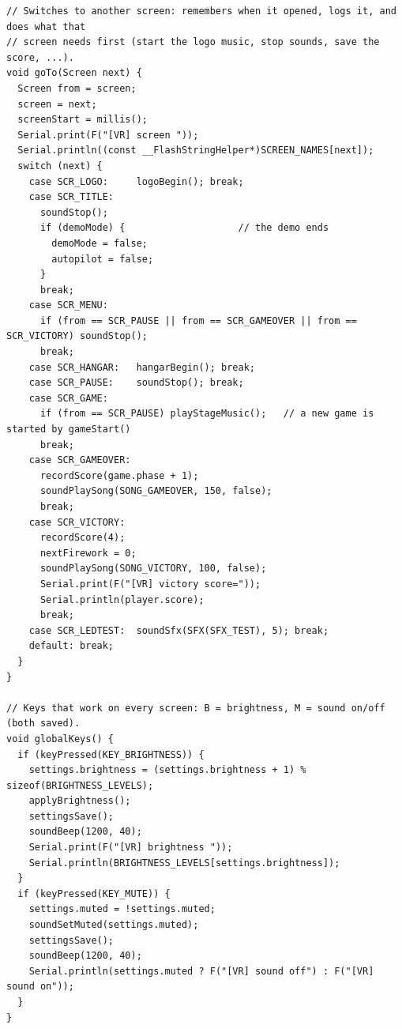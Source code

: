 \documentclass[11pt,a4paper]{article}
\begin{document}
\begin{lstlisting}[language=Arduino]
// Switches to another screen: remembers when it opened, logs it, and does what that
// screen needs first (start the logo music, stop sounds, save the score, ...).
void goTo(Screen next) {
  Screen from = screen;
  screen = next;
  screenStart = millis();
  Serial.print(F("[VR] screen "));
  Serial.println((const __FlashStringHelper*)SCREEN_NAMES[next]);
  switch (next) {
    case SCR_LOGO:     logoBegin(); break;
    case SCR_TITLE:
      soundStop();
      if (demoMode) {                    // the demo ends
        demoMode = false;
        autopilot = false;
      }
      break;
    case SCR_MENU:
      if (from == SCR_PAUSE || from == SCR_GAMEOVER || from == SCR_VICTORY) soundStop();
      break;
    case SCR_HANGAR:   hangarBegin(); break;
    case SCR_PAUSE:    soundStop(); break;
    case SCR_GAME:
      if (from == SCR_PAUSE) playStageMusic();   // a new game is started by gameStart()
      break;
    case SCR_GAMEOVER:
      recordScore(game.phase + 1);
      soundPlaySong(SONG_GAMEOVER, 150, false);
      break;
    case SCR_VICTORY:
      recordScore(4);
      nextFirework = 0;
      soundPlaySong(SONG_VICTORY, 100, false);
      Serial.print(F("[VR] victory score="));
      Serial.println(player.score);
      break;
    case SCR_LEDTEST:  soundSfx(SFX(SFX_TEST), 5); break;
    default: break;
  }
}

// Keys that work on every screen: B = brightness, M = sound on/off (both saved).
void globalKeys() {
  if (keyPressed(KEY_BRIGHTNESS)) {
    settings.brightness = (settings.brightness + 1) % sizeof(BRIGHTNESS_LEVELS);
    applyBrightness();
    settingsSave();
    soundBeep(1200, 40);
    Serial.print(F("[VR] brightness "));
    Serial.println(BRIGHTNESS_LEVELS[settings.brightness]);
  }
  if (keyPressed(KEY_MUTE)) {
    settings.muted = !settings.muted;
    soundSetMuted(settings.muted);
    settingsSave();
    soundBeep(1200, 40);
    Serial.println(settings.muted ? F("[VR] sound off") : F("[VR] sound on"));
  }
}


\end{lstlisting}
\end{document}
